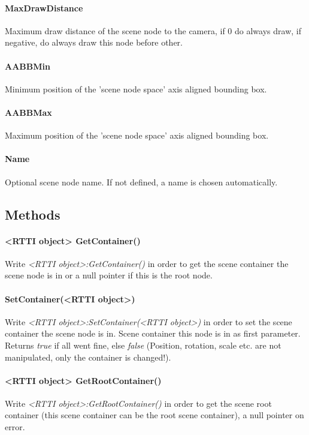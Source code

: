\paragraph{MaxDrawDistance}
Maximum draw distance of the scene node to the camera, if 0 do always draw, if negative, do always draw this node before other.

\paragraph{AABBMin}
Minimum position of the 'scene node space' axis aligned bounding box.

\paragraph{AABBMax}
Maximum position of the 'scene node space' axis aligned bounding box.

\paragraph{Name}
Optional scene node name. If not defined, a name is chosen automatically.


\subsection{Methods}

\paragraph{<RTTI object> GetContainer()}
Write \emph{<RTTI object>:GetContainer()} in order to get the scene container the scene node is in or a null pointer if this is the root node.

\paragraph{SetContainer(<RTTI object>)}
Write \emph{<RTTI object>:SetContainer(<RTTI object>)} in order to set the scene container the scene node is in. Scene container this node is in as first parameter. Returns \emph{true} if all went fine, else \emph{false} (Position, rotation, scale etc. are not manipulated, only the container is changed!).

\paragraph{<RTTI object> GetRootContainer()}
Write \emph{<RTTI object>:GetRootContainer()} in order to get the scene root container (this scene container can be the root scene container), a null pointer on error.

